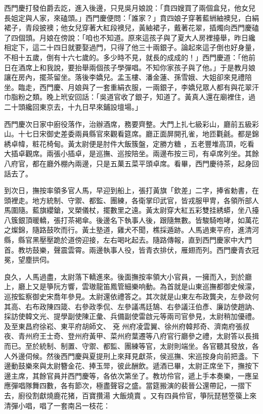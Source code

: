 西門慶打發伯爵去訖，進入後邊，只見吳月娘說：「賁四嫂買了兩個盒兒，他女兒長姐定與人家，來磕頭。」西門慶便問：「誰家？」賁四娘子穿著藍絒紬襖兒，白絹裙子，青段披襖；他女兒穿著大紅段襖兒，黃紬裙子，戴著花翠，插燭向西門慶磕了四個頭。月娘在傍說：「咱也不知道。原來這孩子與了夏大人房裡擡舉，昨日纔相定下，這二十四日就要娶過門，只得了他三十兩銀子。論起來這子倒也好身量，不相十五歲，倒有十六七歲的。多少時不見，就長的成成的！」西門慶道：「他前日在酒席上和我說，要抬舉兩個孩子學彈唱。不知你家孩子與了他。」于是教月娘讓在房內，擺茶留坐。落後李嬌兒。孟玉樓、潘金蓮、孫雪娥、大姐卻來見禮陪坐。臨走，西門慶、月娘與了一套重絹衣服，一兩銀子，李嬌兒眾人都有與花翠汗巾脂粉之類。晚上玳安回話：「吳道官收了銀子，知道了。黃真人還在廟裡住，過二十頭纔回東京去，十九日早來鋪設壇場。」

西門慶次日家中廚役落作，治辦酒席，務要齊整。大門上扎七級彩山，廳前五級彩山。十七日宋御史差委兩員縣官來觀看筵席。廳正面屏開孔雀，地匝氍毹。都是錦綉卓幃，粧花椅甸。黃太尉便是肘件大飯簇盤，定勝方糖 ，五老豐堆高頂，吃看大插卓觀席。兩張小插卓，是巡撫、巡按陪坐。兩邊布按三司，有卓席列坐。其餘八府官，都在廳外棚內兩邊，只是五菓五菜平頭卓席。看畢，西門慶待茶，起身回話去了。

到次日，撫按率領多官人馬，早迎到船上，張打黃旗「欽差」二字，捧省勅書，在頭裡走。地方統制、守禦、都監、團練，各衛掌印武官，皆戎服甲冑，各領所部人馬圍隨。藍旗纓鎗，叉槊儀杖，擺數里之遠。黃太尉穿大紅五彩雙挂綉蟒，坐八擡八簇銀頂暖轎，張打茶褐傘。後邊名下執事人後，跟隨無數。皆駿騎咆哮，如萬花之燦錦，隨路鼓吹而行。黃土塾道，雞犬不聞，樵採遁跡。人馬過東平府，進清河縣，縣官黑壓壓跪於道傍迎接，左右喝叱起去。隨路傳報，直到西門慶家中大門首。教坊鼓樂，聲震雲霄。兩邊執事人役，皆青衣排伏，雁翅而列。西門慶青衣冠冕，望塵拱伺。

良久，人馬過盡，太尉落下轎進來。後面撫按率領大小官員，一擁而入，到於廳上，廳上又是箏阮方響，雲璈龍笛鳳管細樂响動。為首就是山東巡撫都御史候濛，巡按監察御史宋喬年參見。太尉還依禮答之。其次就是山東左布政龔夬，左參政何其高、右布政陳四箴、右參政季侃、左參議馮廷鵠、右參議汪伯彥、廉訪使趙訥、採訪使韓文光、提學副使陳正彙、兵備副使雷啟元等兩司官參見，太尉稍加優禮。及至東昌府徐崧、東平府胡師文、
兗 %
州府凌雲翼、徐州府韓邦奇、濟南府張叔夜、青州府王士奇、登州府黃甲、菜州府葉遷等八府官行廳參之禮，太尉答以長揖而已。至於統制、制置、守禦、都監、團練等官，太尉則端坐。各官聽其發放，各人外邊伺候。然後西門慶與夏提刑上來拜見獻茶，侯巡撫、宋巡按身向前把盞。下邊動鼓樂來與太尉簪金花、捧玉斝，彼此酬飲。遞酒已畢，太尉正席坐下，撫按下邊主席，其餘官員并西門慶等，各依次第坐了。教坊伶官，遞上手本奏樂，一應呈應彈唱隊舞四數，各有節次，極盡聲容之盛。當筵搬演的裴晉公還帶記，一摺下去，廚役割獻燒鹿花猪，百寶攢湯 大飯燒賣 。又有四員伶官，箏阮琵琶箜篌上來清彈小唱，唱了一套南呂一枝花：

